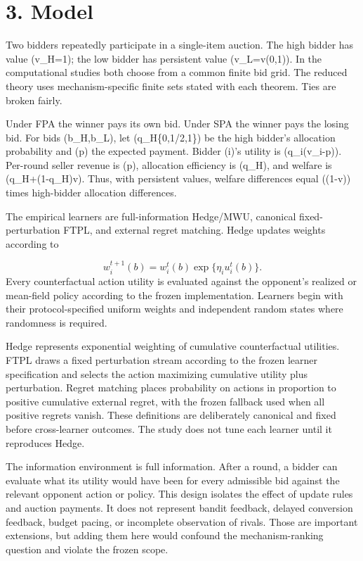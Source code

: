 \documentclass[11pt]{article}
\begin{document}
\section{3. Model}
Two bidders repeatedly participate in a single-item auction. The high bidder has value (v_H=1); the low bidder has persistent value (v_L=v\in(0,1)). In the computational studies both choose from a common finite bid grid. The reduced theory uses mechanism-specific finite sets stated with each theorem. Ties are broken fairly.

Under FPA the winner pays its own bid. Under SPA the winner pays the losing bid. For bids (b_H,b_L), let (q_H\in\{0,1/2,1\}) be the high bidder's allocation probability and (p) the expected payment. Bidder (i)'s utility is (q_i(v_i-p)). Per-round seller revenue is (p), allocation efficiency is (q_H), and welfare is (q_H+(1-q_H)v). Thus, with persistent values, welfare differences equal ((1-v)) times high-bidder allocation differences.

The empirical learners are full-information Hedge/MWU, canonical fixed-perturbation FTPL, and external regret matching. Hedge updates weights according to

\[
w_i^{t+1}(b)=w_i^t(b)\exp\{\eta_i u_i^t(b)\}.
\]
Every counterfactual action utility is evaluated against the opponent's realized or mean-field policy according to the frozen implementation. Learners begin with their protocol-specified uniform weights and independent random states where randomness is required.

Hedge represents exponential weighting of cumulative counterfactual utilities. FTPL draws a fixed perturbation stream according to the frozen learner specification and selects the action maximizing cumulative utility plus perturbation. Regret matching places probability on actions in proportion to positive cumulative external regret, with the frozen fallback used when all positive regrets vanish. These definitions are deliberately canonical and fixed before cross-learner outcomes. The study does not tune each learner until it reproduces Hedge.

The information environment is full information. After a round, a bidder can evaluate what its utility would have been for every admissible bid against the relevant opponent action or policy. This design isolates the effect of update rules and auction payments. It does not represent bandit feedback, delayed conversion feedback, budget pacing, or incomplete observation of rivals. Those are important extensions, but adding them here would confound the mechanism-ranking question and violate the frozen scope.
\end{document}
